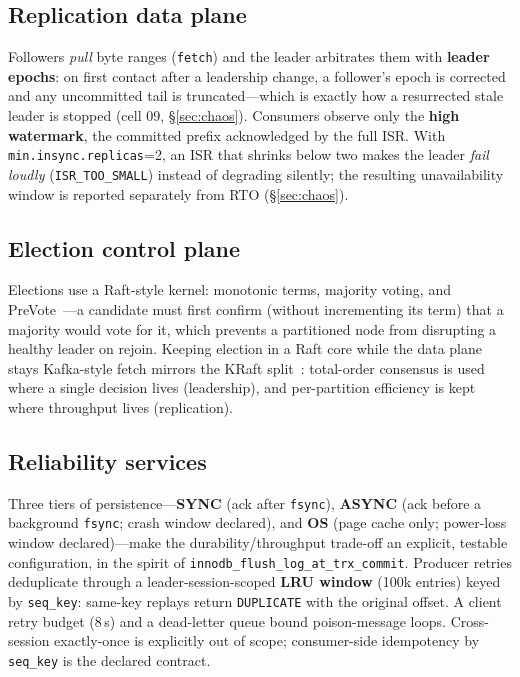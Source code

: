 \documentclass[letterpaper,twocolumn,10pt]{article}
\begin{document}
\subsection{Replication data plane}
Followers \emph{pull} byte ranges (\texttt{fetch}) and the leader
arbitrates them with \textbf{leader epochs}: on first contact after a
leadership change, a follower's epoch is corrected and any uncommitted
tail is truncated---which is exactly how a resurrected stale leader is
stopped (cell 09, \S\ref{sec:chaos}). Consumers observe only the
\textbf{high watermark}, the committed prefix acknowledged by the full
ISR. With \texttt{min.insync.replicas}=2, an ISR that shrinks below two
makes the leader \emph{fail loudly} (\texttt{ISR\_TOO\_SMALL}) instead of
degrading silently; the resulting unavailability window is reported
separately from RTO (\S\ref{sec:chaos}).

\subsection{Election control plane}
Elections use a Raft-style kernel: monotonic terms, majority voting, and
PreVote~\cite{ongaro14raft}---a candidate must first confirm (without
incrementing its term) that a majority would vote for it, which prevents
a partitioned node from disrupting a healthy leader on rejoin. Keeping
election in a Raft core while the data plane stays Kafka-style fetch
mirrors the KRaft split~\cite{kip500}: total-order consensus is used
where a single decision lives (leadership), and per-partition
efficiency is kept where throughput lives (replication).

\subsection{Reliability services}
Three tiers of persistence---\textbf{SYNC} (ack after \texttt{fsync}),
\textbf{ASYNC} (ack before a background \texttt{fsync}; crash window
declared), and \textbf{OS} (page cache only; power-loss window
declared)---make the durability/throughput trade-off an explicit,
testable configuration, in the spirit of
\texttt{innodb\_flush\_log\_at\_trx\_commit}. Producer retries deduplicate
through a leader-session-scoped \textbf{LRU window} (100k entries) keyed
by \texttt{seq\_key}: same-key replays return \texttt{DUPLICATE} with the
original offset. A client retry budget (8\,s) and a dead-letter queue
bound poison-message loops. Cross-session exactly-once is explicitly out
of scope; consumer-side idempotency by \texttt{seq\_key} is the declared
contract.
\end{document}

